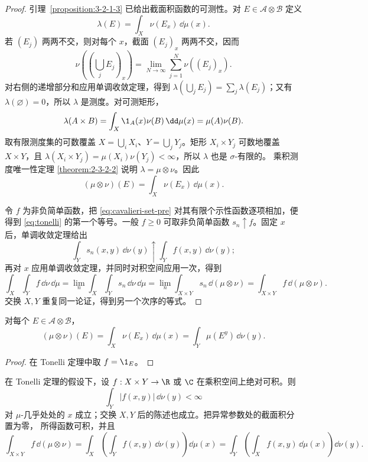 \begin{proof}
引理~\ref{proposition:3-2-1-3} 已给出截面积函数的可测性。对
$E\in\mathcal A\otimes\mathcal B$ 定义
\[
 \lambda(E)=\int_X\nu(E_x)\,\dd\mu(x).
\]
若 $(E_j)$ 两两不交，则对每个 $x$，截面 $(E_j)_x$ 两两不交，因而
\[
 \nu\!\left(\left(\bigcup_jE_j\right)_x\right)
 =\lim_{N\to\infty}\sum_{j=1}^N\nu((E_j)_x).
\]
对右侧的递增部分和应用单调收敛定理，得到
$\lambda(\bigcup_jE_j)=\sum_j\lambda(E_j)$；又有 $\lambda(\varnothing)=0$，所以
$\lambda$ 是测度。对可测矩形，
\[
 \lambda(A\times B)=\int_X\1_A(x)\nu(B)\,\dd\mu(x)=\mu(A)\nu(B).
\]
取有限测度集的可数覆盖 $X=\bigcup_iX_i$、$Y=\bigcup_jY_j$。矩形
$X_i\times Y_j$ 可数地覆盖 $X\times Y$，且
$\lambda(X_i\times Y_j)=\mu(X_i)\nu(Y_j)<\infty$，所以 $\lambda$ 也是 $\sigma$-有限的。
乘积测度唯一性定理
\ref{theorem:2-3-2-2} 说明 $\lambda=\mu\otimes\nu$。因此
\[
 (\mu\otimes\nu)(E)=\int_X\nu(E_x)\,\dd\mu(x).
 \tag{3.2.3}\label{eq:cavalieri-set-pre}
\]

令 $f$ 为非负简单函数，把 \eqref{eq:cavalieri-set-pre} 对其有限个示性函数逐项相加，便得到
\eqref{eq:tonelli} 的第一个等号。一般 $f\ge0$ 可取非负简单函数
$s_n\uparrow f$。固定 $x$ 后，单调收敛定理给出
\[
 \int_Ys_n(x,y)\,\dd\nu(y)\uparrow \int_Yf(x,y)\,\dd\nu(y);
\]
再对 $x$ 应用单调收敛定理，并同时对积空间应用一次，得到
\[
 \int_X\int_Y f\,\dd\nu\,\dd\mu
 =\lim_n\int_X\int_Ys_n\,\dd\nu\,\dd\mu
 =\lim_n\int_{X\times Y}s_n\,\dd(\mu\otimes\nu)
 =\int_{X\times Y}f\,\dd(\mu\otimes\nu).
\]
交换 $X,Y$ 重复同一论证，得到另一个次序的等式。
\end{proof}

\begin{corollary}[Cavalieri 原理]\label{corollary:3-2-1-4}
对每个 $E\in\mathcal A\otimes\mathcal B$，
\[
 (\mu\otimes\nu)(E)=\int_X\nu(E_x)\,\dd\mu(x)
 =\int_Y\mu(E^y)\,\dd\nu(y).
\]
\end{corollary}

\begin{proof}
在 Tonelli 定理中取 $f=\1_E$。
\end{proof}

\begin{theorem}[Fubini 定理]\label{theorem:3-2-1-2}
在 Tonelli 定理的假设下，设 $f:X\times Y\to\R$ 或 $\C$ 在乘积空间上绝对可积。则
\[
 \int_Y|f(x,y)|\,\dd\nu(y)<\infty
\]
对 $\mu$-几乎处处的 $x$ 成立；交换 $X,Y$ 后的陈述也成立。把异常参数处的截面积分置为零，
所得函数可积，并且
\[
 \int_{X\times Y}f\,\dd(\mu\otimes\nu)
 =\int_X\!\left(\int_Y f(x,y)\,\dd\nu(y)\right)\dd\mu(x)
 =\int_Y\!\left(\int_X f(x,y)\,\dd\mu(x)\right)\dd\nu(y).
 \tag{3.2.4}\label{eq:fubini}
\]
\end{theorem}

